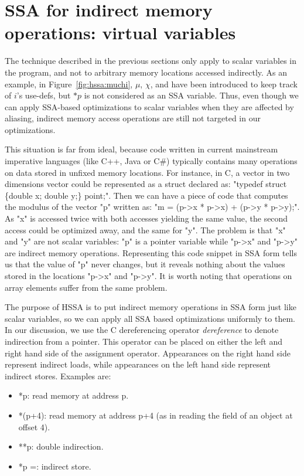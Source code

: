 \section{SSA for indirect memory operations: virtual variables}

The technique described in the previous sections only apply to scalar variables in the program, and not to arbitrary memory locations accessed indirectly. As an example, in Figure~\ref{fig:hssa:muchi}, $\mu$, $\chi$, and \phifuns have been introduced to keep track of $i$'s use-defs, but $*p$ is not considered as an SSA variable. 
Thus, even though we can apply SSA-based optimizations to scalar variables when they are affected by aliasing, indirect memory access operations are still not targeted in our optimizations.

This situation is far from ideal, because code written in current mainstream imperative languages (like C++, Java or C\#) typically contains many operations on data stored in unfixed memory locations.
For instance, in C, a vector in two dimensions vector could be represented as a struct declared as: "typedef struct \{double x; double y;\} point;".
Then we can have a piece of code that computes the modulus of the vector "p" written as: "m = (p-\textgreater x * p-\textgreater x) + (p-\textgreater y * p-\textgreater y);".
As "x" is accessed twice with both accesses yielding the same value, the second access could be optimized away, and the same for "y".
The problem is that "x" and "y" are not scalar variables: "p" is a pointer variable while "p-\textgreater x" and "p-\textgreater y" are indirect memory operations.
Representing this code snippet in SSA form tells us that the value of "p" never changes, but it reveals nothing about the values stored in the locations "p-\textgreater x" and "p-\textgreater y".
It is worth noting that operations on array elements suffer from the same problem.

The purpose of HSSA is to put indirect memory operations in SSA form just like scalar variables, so we can apply all SSA based optimizations uniformly to them.
In our discussion, we use the C dereferencing operator {\em dereference} to
denote indirection from a pointer.
This operator can be placed on either the left and right hand side of the assignment operator. Appearances on the right hand side represent indirect loads, while
appearances on the left hand side represent indirect stores.  Examples are:
\begin{itemize}
\item *p: read memory at address p.
\item *(p+4): read memory at address p+4 (as in reading the field of an object at offset 4).
\item **p: double indirection.
\item *p =: indirect store.
\end{itemize}


